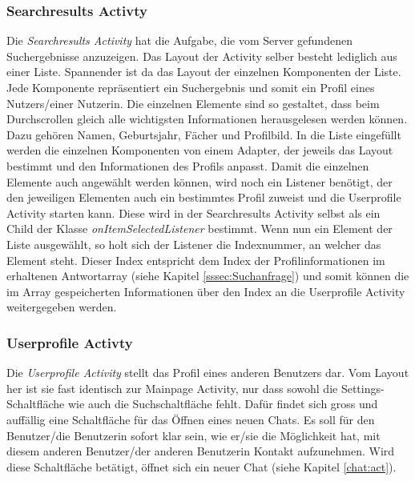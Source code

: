 \documentclass[a4paper,11pt]{report}
\begin{document}
				\subsubsection{Searchresults Activty}
				Die \emph{Searchresults Activity} hat die Aufgabe, die vom Server gefundenen Suchergebnisse anzuzeigen. Das Layout der Activity selber besteht lediglich aus einer Liste. Spannender ist da das Layout der einzelnen Komponenten der Liste. Jede Komponente repräsentiert ein Suchergebnis und somit ein Profil eines Nutzers/einer Nutzerin. Die einzelnen Elemente sind so gestaltet, dass beim Durchscrollen gleich alle wichtigsten Informationen herausgelesen werden können. Dazu gehören Namen, Geburtsjahr, Fächer und Profilbild. In die Liste eingefüllt werden die einzelnen Komponenten von einem Adapter, der jeweils das Layout bestimmt und den Informationen des Profils anpasst. Damit die einzelnen Elemente auch angewählt werden können, wird noch ein Listener benötigt, der den jeweiligen Elementen auch ein bestimmtes Profil zuweist und die Userprofile Activity starten kann. Diese wird in der Searchresults Activity selbst als ein Child der Klasse \emph{onItemSelectedListener} bestimmt. Wenn nun ein Element der Liste ausgewählt, so holt sich der Listener die Indexnummer, an welcher das Element steht. Dieser Index entspricht dem Index der Profilinformationen im erhaltenen Antwortarray (siehe Kapitel \ref{sssec:Suchanfrage}) und somit können die im Array gespeicherten Informationen über den Index an die Userprofile Activity weitergegeben werden.
				
				\subsubsection{Userprofile Activty}
				Die \emph{Userprofile Activity} stellt das Profil eines anderen Benutzers dar. Vom Layout her ist sie fast identisch zur Mainpage Activity, nur dass sowohl die Settings-Schaltfläche wie auch die Suchschaltfläche fehlt. Dafür findet sich gross und auffällig eine Schaltfläche für das Öffnen eines neuen Chats. Es soll für den Benutzer/die Benutzerin sofort klar sein, wie er/sie die Möglichkeit hat, mit diesem anderen Benutzer/der anderen Benutzerin Kontakt aufzunehmen. Wird diese Schaltfläche betätigt, öffnet sich ein neuer Chat (siehe Kapitel \ref{chat:act}). 
				
\end{document}
